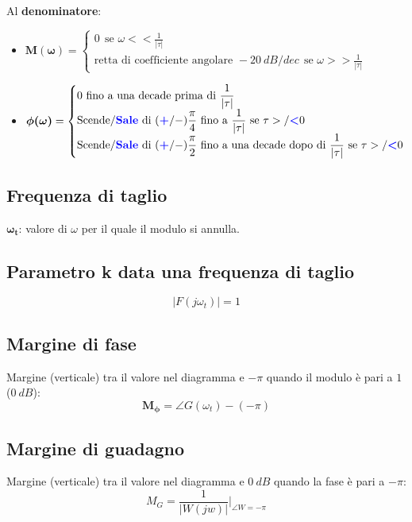 \documentclass{report}
\theoremstyle{nostyle}
\begin{document}
\noindent Al \textbf{denominatore}:
\begin{itemize}
    \item $\bm{M(\omega)} = \begin{cases}
        0 \ \ \text{se } \omega << \displaystyle \frac{1}{|\tau|}\\
        \text{retta di coefficiente angolare } -20\ dB/dec \ \ \text{se } \omega >>  \displaystyle\frac{1}{|\tau|}
    \end{cases}$
    \item $\bm{\phi(\omega)} = \begin{cases}
        0 \ \text{fino a una decade prima di } \displaystyle \frac{1}{|\tau|}\\
        \text{Scende/\textcolor{blue}{\textbf{Sale}} di } (\textcolor{blue}{\bm{+}}/-) \displaystyle \frac{\pi}{4} \ \text{fino a } \displaystyle \frac{1}{|\tau|}  \ \text{se } \tau >/\textcolor{blue}{\bm{<}} 0 \\
        \text{Scende/\textcolor{blue}{\textbf{Sale}} di } (\textcolor{blue}{\bm{+}}/-) \displaystyle \frac{\pi}{2} \ \text{fino a una decade dopo di } \displaystyle \frac{1}{|\tau|}  \ \text{se } \tau >/\textcolor{blue}{\bm{<}} 0 \\

    \end{cases}$
\end{itemize}


\subsection{Frequenza di taglio}
$\bm{\omega_t}$: valore di $\omega$ per il quale il modulo si annulla.

\subsection{Parametro k data una frequenza di taglio}
\[  \left|   F(j \omega_t)       \right| = 1            \]

\subsection{Margine di fase}
Margine (verticale) tra il valore nel diagramma e $-\pi$ quando il modulo è pari a $1$ ($0 \ dB$):
\[    \bm{M_{\phi}} =   \angle G (\omega_t) - (-\pi)       \] 

\subsection{Margine di guadagno}
Margine (verticale) tra il valore nel diagramma e $0 \ dB$ quando la fase è pari a $-\pi$:
\[    M_G = \frac{1}{|W(jw)|} \bigg|_{\angle W = -\pi}    \]
\end{document}
